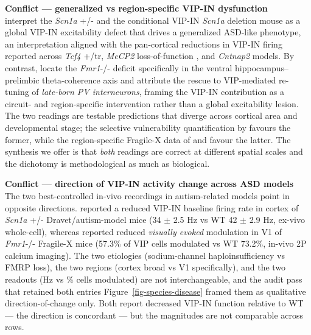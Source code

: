 \documentclass[11pt]{article}
\begin{document}
\begin{framed}
\textbf{Conflict --- generalized vs region-specific VIP-IN dysfunction}\\
\citet{Goff2023} interpret the \textit{Scn1a} +/- and the conditional VIP-IN
\textit{Scn1a} deletion mouse as a global VIP-IN excitability defect that drives
a generalized ASD-like phenotype, an interpretation aligned with the
pan-cortical reductions in VIP-IN firing reported across \textit{Tcf4} +/tr, \textit{MeCP2} loss-of-function \citep{Mossner2020}, and
\textit{Cntnap2} models. By contrast, \citet{Bhandari2024}
locate the \textit{Fmr1}-/- deficit specifically in the ventral
hippocampus--prelimbic theta-coherence axis and attribute the rescue to
VIP-mediated re-tuning of \textit{late-born PV interneurons}, framing the
VIP-IN contribution as a circuit- and region-specific intervention rather
than a global excitability lesion. The two readings are testable
predictions that diverge across cortical area and developmental stage; the
selective vulnerability quantification by \citet{Hanno2026} favours the
former, while the region-specific Fragile-X data of
\citet{Rahmatullah2023} and \citet{Bhandari2024} favour the latter.
The synthesis we offer is that \textit{both} readings are correct at different
spatial scales and the dichotomy is methodological as much as biological.
\end{framed}

\begin{framed}
\textbf{Conflict --- direction of VIP-IN activity change across ASD models}\\
The two best-controlled in-vivo recordings in autism-related models point
in opposite directions. \citet{Goff2023} reported a reduced VIP-IN
baseline firing rate in cortex of \textit{Scn1a} +/- Dravet/autism-model mice
(34 $\pm$ 2.5 Hz vs WT 42 $\pm$ 2.9 Hz, ex-vivo whole-cell), whereas
\citet{Rahmatullah2023} reported reduced \textit{visually evoked} modulation
in V1 of \textit{Fmr1}-/- Fragile-X mice (57.3\% of VIP cells modulated vs WT
73.2\%, in-vivo 2P calcium imaging). The two etiologies (sodium-channel
haploinsufficiency vs FMRP loss), the two regions (cortex broad vs V1
specifically), and the two readouts (Hz vs \% cells modulated) are not
interchangeable, and the audit pass that retained both entries
Figure~\ref{fig-species-disease} framed them as qualitative
direction-of-change only. Both report decreased VIP-IN function relative
to WT --- the direction is concordant --- but the magnitudes are not
comparable across rows.
\end{framed}
\end{document}
